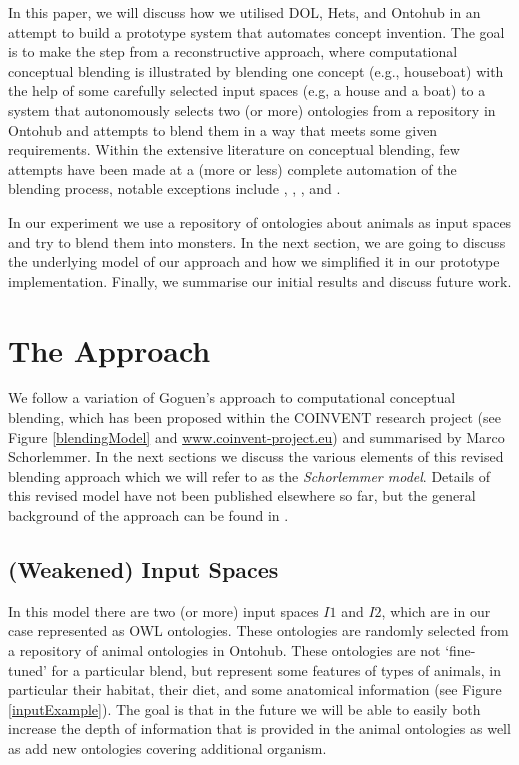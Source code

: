 \documentclass[letterpaper]{article}
\begin{document}
In this paper, we will discuss how we utilised DOL, Hets, and Ontohub in an attempt to build 
a prototype system that automates concept invention. The goal is to make the step from a
 reconstructive approach, where computational conceptual blending is illustrated by blending 
 one concept (e.g., houseboat) with the help of some carefully selected input spaces
  (e.g, a house and a boat) to a system that autonomously selects two (or more) ontologies 
  from a repository in Ontohub and attempts to blend them in a way that meets some given requirements. Within the extensive literature on conceptual blending, few attempts have been made at a  (more or less) complete automation of the blending process, notable exceptions include \cite{goguenharrell10}, \cite{Pereira07}, \cite{LiEtAl2012}, and \cite{veale2000computation,Veale2012}.
  
 \medskip\noindent 
  In our experiment we use a repository of ontologies about animals as input spaces and try to blend
   them into monsters.  In the next section, we are going to discuss the underlying model 
   of our approach and how we simplified it in our prototype implementation.  Finally, we summarise our initial results and discuss future work. 

\section{The Approach}
We follow a variation of Goguen's approach to computational conceptual blending,
which has been proposed within the COINVENT research project (see Figure \ref{blendingModel} and \url{www.coinvent-project.eu}) and summarised by Marco Schorlemmer. In the next sections we discuss the various elements of this revised blending approach which we will refer to as the \emph{Schorlemmer model}. Details of this revised model have not been published elsewhere so far, but the general background of the approach can be found in \cite{iccc14-coinvent}.

\subsection{(Weakened) Input Spaces}
 In this model there are two (or more) input spaces $I1$ and $I2$, which are in our 
 case represented as OWL ontologies.  These ontologies are randomly selected from a repository 
 of animal ontologies in Ontohub. These ontologies are not `fine-tuned' for a particular blend, 
 but represent some features of types of animals, in particular their habitat, their diet, 
 and some anatomical information (see Figure \ref{inputExample}). The goal is that in the future 
 we will be able to easily both increase the depth of information that is provided in the animal ontologies as 
 well as add new ontologies covering additional organism. 
 
\end{document}
